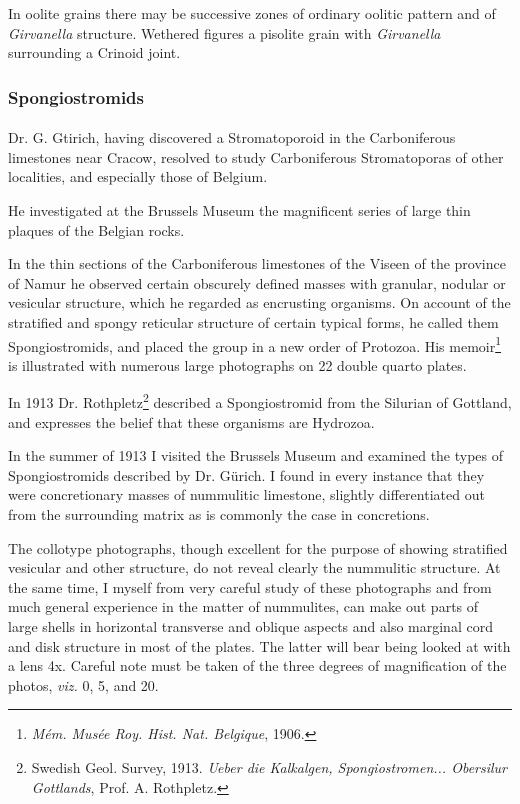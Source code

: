 \documentclass[a4paper, 12pt, oneside]{article}
\begin{document}
In oolite grains there may be successive zones of ordinary oolitic pattern and of \emph{Girvanella} structure. Wethered figures a pisolite grain with \emph{Girvanella} surrounding a Crinoid joint.

\subsubsection{Spongiostromids}
\paragraph{}
Dr. G. Gtirich, having discovered a Stromatoporoid in the Carboniferous limestones near Cracow, resolved to study Carboniferous Stromatoporas of other localities, and especially those of Belgium.

He investigated at the Brussels Museum the magnificent series of large thin plaques of the Belgian rocks.

In the thin sections of the Carboniferous limestones of the Viseen of the province of Namur he observed certain obscurely defined masses with granular, nodular or vesicular structure, which he regarded as encrusting organisms. On account of the stratified and spongy reticular structure of certain typical forms, he called them Spongiostromids, and placed the group in a new order of Protozoa. His memoir\footnote{\emph{Mém. Musée Roy. Hist. Nat. Belgique}, 1906.} is illustrated with numerous large photographs on 22 double quarto plates.

In 1913 Dr. Rothpletz\footnote{Swedish Geol. Survey, 1913. \emph{Ueber die Kalkalgen, Spongiostromen... Obersilur Gottlands}, Prof. A. Rothpletz.} described a Spongiostromid from the Silurian of Gottland, and expresses the belief that these organisms are Hydrozoa.

In the summer of 1913 I visited the Brussels Museum and examined the types of Spongiostromids described by Dr. Gürich. I found in every instance that they were concretionary masses of nummulitic limestone, slightly differentiated out from the surrounding matrix as is commonly the case in concretions.

The collotype photographs, though excellent for the purpose of showing stratified vesicular and other structure, do not reveal clearly the nummulitic structure. At the same time, I myself from very careful study of these photographs and from much general experience in the matter of nummulites, can make out parts of large shells in horizontal transverse and oblique aspects and also marginal cord and disk structure in most of the plates. The latter will bear being looked at with a lens 4x. Careful note must be taken of the three degrees of magnification of the photos, \emph{viz.} 0, 5, and 20.
\end{document}
